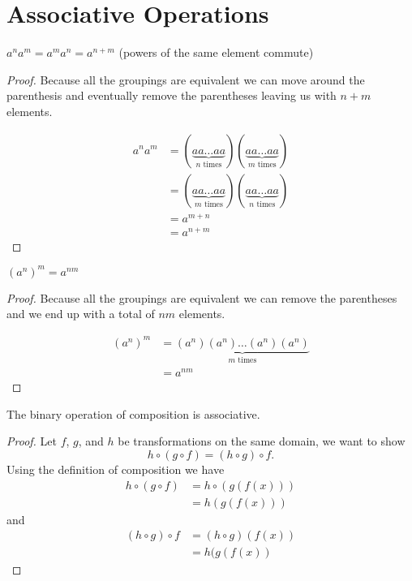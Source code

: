 
\chapter{Associative Operations}


\begin{lemma}
	$a^na^m = a^ma^n = a^{n+m}$ (powers of the same element commute)
\end{lemma}

\begin{proof}
	Because all the groupings are equivalent we can move around the parenthesis and eventually remove
	the parentheses leaving us with $n + m$ elements.

	\begin{align*}
		a^na^m
		&= (\underbrace{aa \ldots aa}_{n \text{ times}})(\underbrace{aa \dots aa}_{m \text{ times}})\\
		&= (\underbrace{aa \ldots aa}_{m \text{ times}})(\underbrace{aa \dots aa}_{n \text{ times}})\\
		&= a^{m + n}\\
		&= a^{n + m}
	\end{align*}
\end{proof}

\begin{lemma}
	$(a^n)^m = a^{nm}$
\end{lemma}

\begin{proof}
	Because all the groupings are equivalent we can remove the parentheses and we end up with a total of
	$nm$ elements.

	\begin{align*}
		(a^n)^m
		&= \underbrace{(a^n)(a^n) \ldots (a^n)(a^n)}_{m \text{ times}}\\
		&= a^{nm}
	\end{align*}
\end{proof}

\begin{lemma}
	The binary operation of composition is associative.
\end{lemma}

\begin{proof}
	Let $f$, $g$, and $h$ be transformations on the same domain, we want to show
	\[ h \circ (g \circ f) = (h \circ g) \circ f. \]
	Using the definition of composition we have
	\begin{align*}
		h \circ (g \circ f)
		&= h \circ (g(f(x)))\\
		&= h(g(f(x)))
	\end{align*}
	and
	\begin{align*}
		(h \circ g) \circ f
		&= (h \circ g)(f(x))\\
		&= h(g(f(x))
	\end{align*}
\end{proof}

